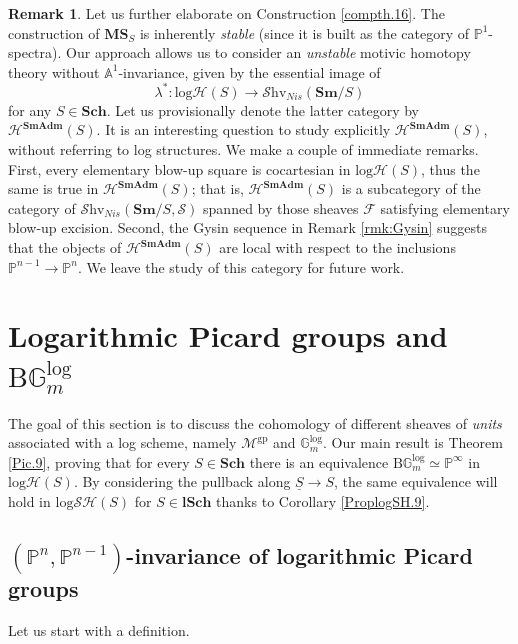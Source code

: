 \documentclass[11pt, a4paper]{amsart}
\theoremstyle{definition}
\newtheorem{rmk}[thm]{Remark}
\numberwithin{equation}{subsection}
\renewcommand{\P}{\mathbb{P}}
\newcommand{\A}{\mathbb{A}}
\newcommand{\Sch}{\mathbf{Sch}}
\newcommand{\lSch}{\mathbf{lSch}}
\newcommand{\Sm}{\mathbf{Sm}}
\newcommand{\SmAdm}{\mathbf{SmAdm}}
\renewcommand{\ul}{\underline}
\newcommand{\gp}{{\mathrm{gp}}}
\newcommand{\clspace}{\mathrm{B}}
\newcommand{\cF}{\mathcal{F}}
\newcommand{\Gmm}{\mathbb{G}_m^{\mathrm{log}}}
\newcommand{\infSpc}{\mathcal{S}}
\newcommand{\infShv}{\mathcal{S}\mathrm{hv}}
\newcommand{\inflogH}{\mathrm{log}\mathcal{H}}
\newcommand{\inflogSH}{\mathrm{log}\mathcal{SH}}
\newcommand{\MS}{\mathbf{MS}}
\begin{document}
\begin{rmk} Let us further elaborate on 
Construction \ref{compth.16}.
    The construction of $\MS_S$ is inherently \emph{stable} (since it is built as the category of $\P^1$-spectra). Our approach allows us to consider an \emph{unstable} motivic homotopy theory without $\A^1$-invariance, given by the essential image of \[\lambda^*\colon \inflogH(S) \to \infShv_{Nis}(\Sm/S)\]
    for any $S\in \Sch$. 
    Let us provisionally denote the latter category by $\mathcal{H}^{\SmAdm}(S)$.
   It is an interesting question to study explicitly $\mathcal{H}^{\SmAdm}(S)$, without referring to log structures.  We make a couple of immediate remarks. First, every elementary blow-up square is cocartesian in $\inflogH(S)$, thus the same is true in $\mathcal{H}^{\SmAdm}(S)$; that is, $\mathcal{H}^{\SmAdm}(S)$ is a subcategory of the category of $\infShv_{Nis}(\Sm/S, \infSpc)$ spanned by those sheaves $\cF$ satisfying elementary blow-up excision.
Second, the Gysin sequence in Remark \ref{rmk:Gysin} suggests that the objects of $\mathcal{H}^{\SmAdm}(S)$ are local with respect to the inclusions $\P^{n-1} \to \P^n$.
    We leave the study of this category for future work. 
\end{rmk}


\newpage


\section{Logarithmic Picard groups and \texorpdfstring{$\clspace \Gmm$}{BGm}}
\label{section:lpg}
The goal of this section is to discuss the cohomology of different sheaves of \emph{units} associated with a log scheme, namely $\mathcal{M}^{\gp}$ and $\Gmm$. Our main result is Theorem \ref{Pic.9}, proving that for every $S\in \Sch$ there is an equivalence $\clspace \Gmm \simeq \P^\infty$ in $\inflogH(S)$. By considering the pullback along $\ul{S}\to S$, the same equivalence will hold in  $\inflogSH(S)$ for $S\in \lSch$ thanks to Corollary \ref{ProplogSH.9}.

\subsection{\texorpdfstring{$(\P^n,\P^{n-1})$}{(Pn,Pn-1)}-invariance of logarithmic Picard groups}
Let us start with a definition.
\end{document}
